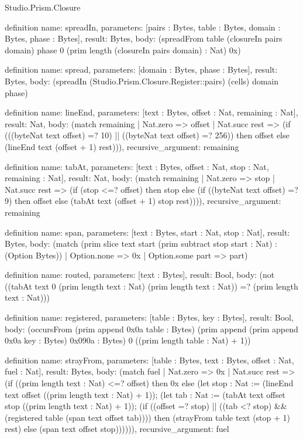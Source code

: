 \begin{lexlean}{Studio.Prism.Closure}
\begin{semanticmodule}
definition{
  name: spreadIn,
  parameters: [pairs : Bytes, table : Bytes, domain : Bytes, phase : Bytes],
  result: Bytes,
  body: (spreadFrom table (closureIn pairs domain) phase 0 (prim length (closureIn pairs domain) : Nat) 0x)
}

definition{
  name: spread,
  parameters: [domain : Bytes, phase : Bytes],
  result: Bytes,
  body: (spreadIn (Studio.Prism.Closure.Register::pairs) (cells) domain phase)
}

definition{
  name: lineEnd,
  parameters: [text : Bytes, offset : Nat, remaining : Nat],
  result: Nat,
  body: (match remaining
    | Nat.zero => offset
    | Nat.succ rest => (if (((byteNat text offset) =? 10) || ((byteNat text offset) =? 256)) then offset else (lineEnd text (offset + 1) rest))),
  recursive_argument: remaining
}

definition{
  name: tabAt,
  parameters: [text : Bytes, offset : Nat, stop : Nat, remaining : Nat],
  result: Nat,
  body: (match remaining
    | Nat.zero => stop
    | Nat.succ rest => (if (stop <=? offset) then stop else (if ((byteNat text offset) =? 9) then offset else (tabAt text (offset + 1) stop rest)))),
  recursive_argument: remaining
}

definition{
  name: span,
  parameters: [text : Bytes, start : Nat, stop : Nat],
  result: Bytes,
  body: (match (prim slice text start (prim subtract stop start : Nat) : (Option Bytes))
    | Option.none => 0x
    | Option.some part => part)
}

definition{
  name: routed,
  parameters: [text : Bytes],
  result: Bool,
  body: (not ((tabAt text 0 (prim length text : Nat) (prim length text : Nat)) =? (prim length text : Nat)))
}

definition{
  name: registered,
  parameters: [table : Bytes, key : Bytes],
  result: Bool,
  body: (occursFrom (prim append 0x0a table : Bytes) (prim append (prim append 0x0a key : Bytes) 0x090a : Bytes) 0 ((prim length table : Nat) + 1))
}

definition{
  name: strayFrom,
  parameters: [table : Bytes, text : Bytes, offset : Nat, fuel : Nat],
  result: Bytes,
  body: (match fuel
    | Nat.zero => 0x
    | Nat.succ rest => (if ((prim length text : Nat) <=? offset) then 0x else (let stop : Nat := (lineEnd text offset ((prim length text : Nat) + 1)); (let tab : Nat := (tabAt text offset stop ((prim length text : Nat) + 1)); (if ((offset =? stop) || ((tab <? stop) && (registered table (span text offset tab)))) then (strayFrom table text (stop + 1) rest) else (span text offset stop)))))),
  recursive_argument: fuel
}


\end{semanticmodule}
\end{lexlean}

